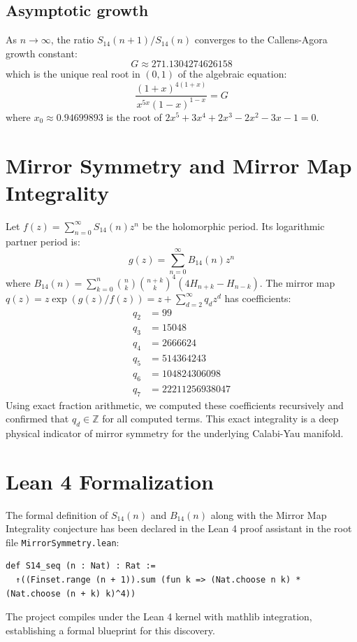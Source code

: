 \documentclass[12pt,reqno]{amsart}
\theoremstyle{plain}
\theoremstyle{definition}
\begin{document}
\subsection{Asymptotic growth}
As $n \to \infty$, the ratio $S_{14}(n+1)/S_{14}(n)$ converges to the Callens-Agora growth constant:
\[ G \approx 271.1304274626158 \]
which is the unique real root in $(0, 1)$ of the algebraic equation:
\[ \frac{(1+x)^{4(1+x)}}{x^{5x}(1-x)^{1-x}} = G \]
where $x_0 \approx 0.94699893$ is the root of $2x^5 + 3x^4 + 2x^3 - 2x^2 - 3x - 1 = 0$.

\section{Mirror Symmetry and Mirror Map Integrality}
Let $f(z) = \sum_{n=0}^\infty S_{14}(n) z^n$ be the holomorphic period. Its logarithmic partner period is:
\[ g(z) = \sum_{n=0}^\infty B_{14}(n) z^n \]
where $B_{14}(n) = \sum_{k=0}^n \binom{n}{k} \binom{n+k}{k}^4 (4 H_{n+k} - H_{n-k})$.
The mirror map $q(z) = z \exp(g(z)/f(z)) = z + \sum_{d=2}^\infty q_d z^d$ has coefficients:
\begin{align*}
q_2 &= 99 \\
q_3 &= 15048 \\
q_4 &= 2666624 \\
q_5 &= 514364243 \\
q_6 &= 104824306098 \\
q_7 &= 22211256938047
\end{align*}
Using exact fraction arithmetic, we computed these coefficients recursively and confirmed that $q_d \in \mathbb{Z}$ for all computed terms. This exact integrality is a deep physical indicator of mirror symmetry for the underlying Calabi-Yau manifold.

\section{Lean 4 Formalization}
The formal definition of $S_{14}(n)$ and $B_{14}(n)$ along with the Mirror Map Integrality conjecture has been declared in the Lean 4 proof assistant in the root file \texttt{MirrorSymmetry.lean}:
\begin{verbatim}
def S14_seq (n : Nat) : Rat :=
  ↑((Finset.range (n + 1)).sum (fun k => (Nat.choose n k) * (Nat.choose (n + k) k)^4))
\end{verbatim}
The project compiles under the Lean 4 kernel with mathlib integration, establishing a formal blueprint for this discovery.
\end{document}
